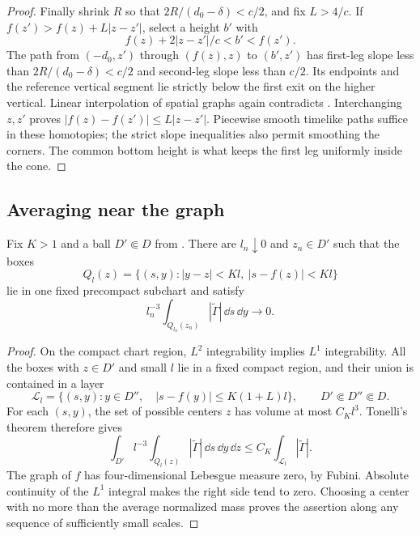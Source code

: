 \begin{proof}
Finally shrink $R$ so that $2R/(d_0-\delta)<c/2$, and fix
$L>4/c$.  If $f(z')>f(z)+L|z-z'|$, select a height $b'$ with
\[
       f(z)+2|z-z'|/c<b'<f(z').
\]
The path from $(-d_0,z')$ through $(f(z),z)$ to $(b',z')$
has first-leg slope less than $2R/(d_0-\delta)<c/2$ and
second-leg slope less than $c/2$.  Its endpoints and the
reference vertical segment lie strictly below the first exit
on the higher vertical.  Linear interpolation of spatial
graphs again contradicts .  Interchanging
$z,z'$ proves $|f(z)-f(z')|\le L|z-z'|$.  Piecewise smooth
timelike paths suffice in these homotopies; the strict slope
inequalities also permit smoothing the corners.  The common
bottom height is what keeps the first leg uniformly inside
the cone.
\end{proof}

\subsection{Averaging near the graph}

\begin{lemma}
\label{ex:boxes}
Fix $K>1$ and a ball $D'\Subset D$ from .
There are $l_n\downarrow0$ and $z_n\in D'$ such that the boxes
\[
 Q_l(z)=\{(s,y):|y-z|<Kl,\ |s-f(z)|<Kl\}
\]
lie in one fixed precompact subchart and satisfy
\begin{equation}\label{ex:small-box}
        l_n^{-3}\int_{Q_{l_n}(z_n)}
                   |\widetilde\Gamma|\,\dd s\,\dd y
           \longrightarrow0.
\end{equation}
\end{lemma}

\begin{proof}
On the compact chart region, $L^2$ integrability implies
$L^1$ integrability.  All the boxes with $z\in D'$ and small
$l$ lie in a fixed compact region, and their union is contained
in a layer
\[
       \mathcal L_l=\{(s,y):y\in D'',\quad
                    |s-f(y)|\le K(1+L)l\},
        \qquad D'\Subset D''\Subset D.
\]
For each $(s,y)$, the set of possible centers $z$ has volume
at most $C_Kl^3$.  Tonelli's theorem therefore gives
\[
 \int_{D'} l^{-3}\int_{Q_l(z)}|\widetilde\Gamma|
                   \,\dd s\,\dd y\,\dd z
       \le C_K\int_{\mathcal L_l}|\widetilde\Gamma|.
\]
The graph of $f$ has four-dimensional Lebesgue measure zero,
by Fubini.  Absolute continuity of the $L^1$ integral makes
the right side tend to zero.  Choosing a center with no more
than the average normalized mass proves the assertion along
any sequence of sufficiently small scales.
\end{proof}

